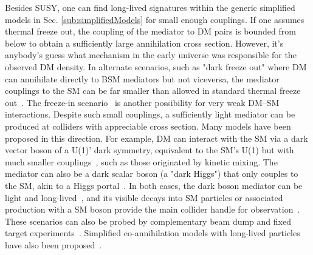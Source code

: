Besides SUSY, one can find long-lived signatures within the generic simplified models in Sec. \ref{sub:simplifiedModels} for small enough couplings. If one assumes thermal freeze out, the coupling of the mediator to DM pairs is bounded from below to obtain a sufficiently large annihilation cross section. However, it's anybody's guess what mechanism in the early universe was responsible for the observed DM density. In alternate scenarios, such as "dark freeze out" where DM can annihilate directly to BSM mediators but not viceversa, the mediator couplings to the SM can be far smaller than allowed in standard thermal freeze out~\cite{Pospelov:2007mp,Das:2010ts}. The freeze-in scenario~\cite{Co:2015pka,Bernal:2017kxu} is another possibility for very weak DM--SM interactions.%
Despite such small couplings, a sufficiently light mediator can be produced at colliders with appreciable cross section. Many models have been proposed in this direction. For example, DM can interact with the SM via a dark vector boson of a U(1)' dark symmetry, equivalent to the SM's U(1) but with much smaller couplings~\cite{Holdom:1985ag}, such as those originated by kinetic mixing. 
The mediator can also be a dark scalar boson (a "dark Higgs") that only couples to the SM, akin to a Higgs portal~\cite{Curtin:2014cca}. 
In both cases, the dark boson mediator can be light and long-lived~\cite{Pospelov:2007mp}, and its visible decays into SM particles or associated production with a SM boson provide the main collider handle for observation~\cite{Curtin:2014cca}. 
These scenarios can also be probed by complementary beam dump and fixed target experiments~\cite{Battaglieri:2017aum}. %
Simplified co-annihilation models with long-lived particles have also been proposed~\cite{ElHedri:2017nny}. 

